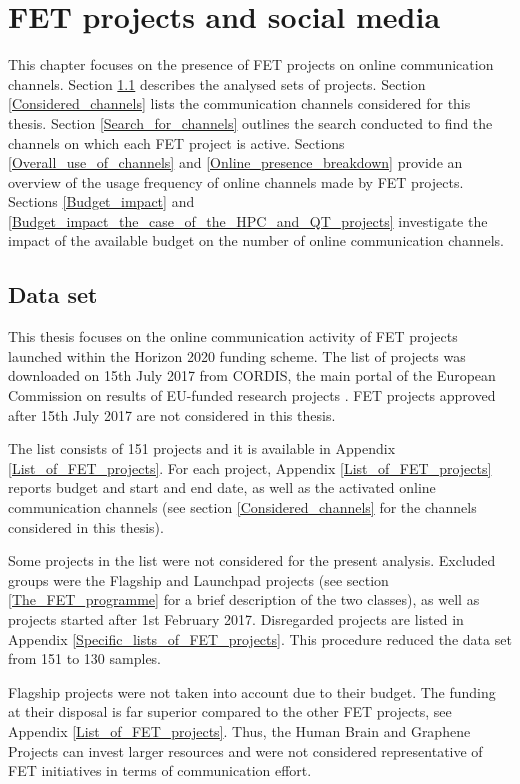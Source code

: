 \chapter{FET projects and social media}
This chapter focuses on the presence of FET projects on online communication channels. Section \ref{Data_set} describes the analysed sets of projects. Section \ref{Considered_channels} lists the communication channels considered for this thesis. Section \ref{Search_for_channels} outlines the search conducted to find the channels on which each FET project is active. Sections \ref{Overall_use_of_channels} and \ref{Online_presence_breakdown} provide an overview of the usage frequency of online channels made by FET projects. Sections \ref{Budget_impact} and \ref{Budget_impact_the_case_of_the_HPC_and_QT_projects} investigate the impact of the available budget on the number of online communication channels.

\section{Data set} \label{Data_set}
This thesis focuses on the online communication activity of FET projects launched within the Horizon 2020 funding scheme. The list of projects was downloaded on 15th July 2017 from CORDIS, the main portal of the European Commission on results of EU-funded research projects \cite{CORDIS}. FET projects approved after 15th July 2017 are not considered in this thesis.

The list consists of 151 projects and it is available in Appendix \ref{List_of_FET_projects}. For each project, Appendix \ref{List_of_FET_projects} reports budget and start and end date, as well as the activated online communication channels (see section \ref{Considered_channels} for the channels considered in this thesis).   

Some projects in the list were not considered for the present analysis. Excluded groups were the Flagship and Launchpad projects (see section \ref{The_FET_programme} for a brief description of the two classes), as well as projects started after 1st February 2017. Disregarded projects are listed in Appendix \ref{Specific_lists_of_FET_projects}. This procedure reduced the data set from 151 to 130 samples.

Flagship projects were not taken into account due to their budget. The funding at their disposal is far superior compared to the other FET projects, see Appendix \ref{List_of_FET_projects}. Thus, the Human Brain and Graphene Projects can invest larger resources and were not considered representative of FET initiatives in terms of communication effort. 

